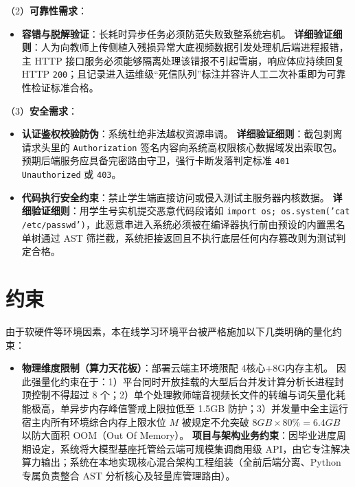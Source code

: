 （2）\textbf{可靠性需求}：
\begin{itemize}
    \item \textbf{容错与脱解验证}：长耗时异步任务必须防范失败致整系统宕机。
    \textbf{详细验证细则}：人为向教师上传侧植入残损异常大底视频数据引发处理机后端进程报错，主 HTTP 接口服务必须能够隔离处理该错报不引起雪崩，响应体应持续回复 HTTP \texttt{200}；且记录进入运维级“死信队列”标注并容许人工二次补重即为可靠性检证标准合格。
\end{itemize}

（3）\textbf{安全需求}：
\begin{itemize}
    \item \textbf{认证鉴权校验防伪}：系统杜绝非法越权资源串调。
    \textbf{详细验证细则}：截包剥离请求头里的 \texttt{Authorization} 签名内容向系统高权限核心数据域发出索取包。预期后端服务应具备完密路由守卫，强行卡断发落判定标准 \texttt{401 Unauthorized} 或 \texttt{403}。
    \item \textbf{代码执行安全约束}：禁止学生端直接访问或侵入测试主服务器内核数据。
    \textbf{详细验证细则}：用学生号实机提交恶意代码段诸如 \texttt{import os; os.system('cat /etc/passwd')}，此恶意串进入系统必须被在编译器执行前由预设的内置黑名单树通过 AST 筛拦截，系统拒接返回且不执行底层任何内存篡改则为测试判定合格。
\end{itemize}

\section{约束}
由于软硬件等环境因素，本在线学习环境平台被严格施加以下几类明确的量化约束：

\begin{itemize}
    \item \textbf{物理维度限制（算力天花板）}：部署云端主环境限配 4核心+8G内存主机。
    因此强量化约束在于：1）平台同时开放挂载的大型后台并发计算分析长进程封顶控制不得超过 8 个；2）单个处理教师端音视频长文件的转编与词矢量化耗能极高，单异步内存峰值警戒上限拉低至 1.5GB 防护；3）并发量中全主运行宿主内所有环境综合内存上限水位 $M$ 被规定不允突破 $8GB \times 80\% = 6.4GB$ 以防大面积 OOM（Out Of Memory）。
    \textbf{项目与架构业务约束}：因毕业进度周期设定，系统将大模型基座托管给云端可规模集调商用级 API，由它专注解决算力输出；系统在本地实现核心混合架构工程组装（全前后端分离、Python 专属负责整合 AST 分析核心及轻量库管理路由）。
\end{itemize}

